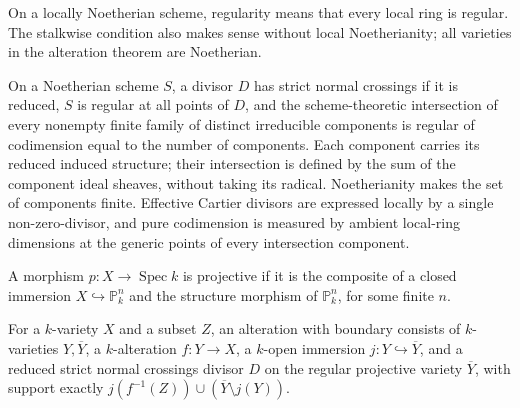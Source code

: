 
\begingroup

\begin{definition}
\label{def:regular-scheme}
\leanok
On a locally Noetherian scheme, regularity means that every local ring is
regular. The stalkwise condition also makes sense without local
Noetherianity; all varieties in the alteration theorem are Noetherian.
\end{definition}

\endgroup

\begingroup

\begin{definition}
\label{def:snc}
\leanok
On a Noetherian scheme $S$, a divisor $D$ has strict normal crossings if it
is reduced, $S$ is regular at all points of $D$, and the scheme-theoretic
intersection of every nonempty finite family of distinct irreducible components
is regular of codimension equal to the number of components. Each component
carries its reduced induced structure; their intersection is defined by the
sum of the component ideal sheaves, without taking its radical. Noetherianity
makes the set of components finite. Effective Cartier divisors are expressed
locally by a single non-zero-divisor, and pure codimension is measured by
ambient local-ring dimensions at the generic points of every intersection
component.
\end{definition}

\endgroup

\begingroup

\begin{definition}[Projectivity]
\label{def:projective-over}
\leanok
A morphism $p:X\to\operatorname{Spec}k$ is projective if it is the composite
of a closed immersion $X\hookrightarrow\mathbb P^n_k$ and the structure
morphism of $\mathbb P^n_k$, for some finite $n$.
\end{definition}

\endgroup

\begingroup

\begin{definition}
\label{def:alteration-output}
\leanok
For a $k$-variety $X$ and a subset $Z$, an alteration with boundary consists
of $k$-varieties $Y,\overline Y$, a $k$-alteration $f:Y\to X$, a $k$-open
immersion $j:Y\hookrightarrow\overline Y$, and a reduced strict normal
crossings divisor $D$ on the regular projective variety $\overline Y$, with
support exactly $j(f^{-1}(Z))\cup(\overline Y\setminus j(Y))$.
\end{definition}

